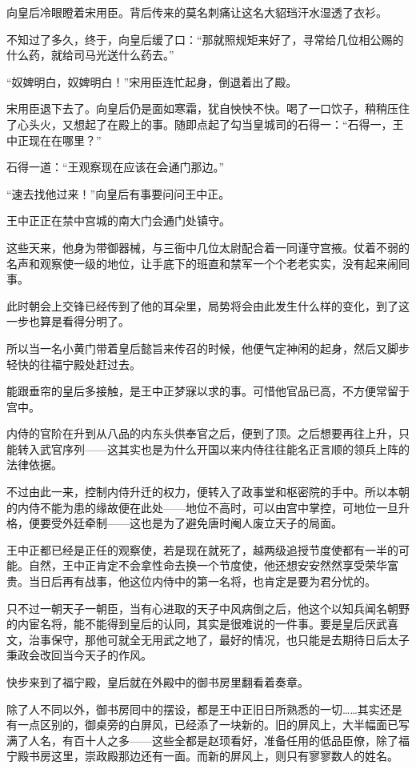 向皇后冷眼瞪着宋用臣。背后传来的莫名刺痛让这名大貂珰汗水湿透了衣衫。

不知过了多久，终于，向皇后缓了口：“那就照规矩来好了，寻常给几位相公赐的什么药，就给司马光送什么药去。”

“奴婢明白，奴婢明白！”宋用臣连忙起身，倒退着出了殿。

宋用臣退下去了。向皇后仍是面如寒霜，犹自怏怏不快。喝了一口饮子，稍稍压住了心头火，又想起了在殿上的事。随即点起了勾当皇城司的石得一：“石得一，王中正现在在哪里？”

石得一道：“王观察现在应该在会通门那边。”

“速去找他过来！”向皇后有事要问问王中正。

王中正正在禁中宫城的南大门会通门处镇守。

这些天来，他身为带御器械，与三衙中几位太尉配合着一同谨守宫掖。仗着不弱的名声和观察使一级的地位，让手底下的班直和禁军一个个老老实实，没有起来闹囘事。

此时朝会上交锋已经传到了他的耳朵里，局势将会由此发生什么样的变化，到了这一步也算是看得分明了。

所以当一名小黄门带着皇后懿旨来传召的时候，他便气定神闲的起身，然后又脚步轻快的往福宁殿处赶过去。


能跟垂帘的皇后多接触，是王中正梦寐以求的事。可惜他官品已高，不方便常留于宫中。

内侍的官阶在升到从八品的内东头供奉官之后，便到了顶。之后想要再往上升，只能转入武官序列——这其实也是为什么开国以来内侍往往能名正言顺的领兵上阵的法律依据。

不过由此一来，控制内侍升迁的权力，便转入了政事堂和枢密院的手中。所以本朝的内侍不能为患的缘故便在此处——地位不高时，可以由宫中掌控，可地位一旦升格，便要受外廷牵制——这也是为了避免唐时阉人废立天子的局面。

王中正都已经是正任的观察使，若是现在就死了，越两级追授节度使都有一半的可能。自然，王中正肯定不会拿性命去换一个节度使，他还想安安然然享受荣华富贵。当日后再有战事，他这位内侍中的第一名将，也肯定是要为君分忧的。

只不过一朝天子一朝臣，当有心进取的天子中风病倒之后，他这个以知兵闻名朝野的内宦名将，能不能得到皇后的认同，其实是很难说的一件事。要是皇后厌武喜文，治事保守，那他可就全无用武之地了，最好的情况，也只能是去期待日后太子秉政会改回当今天子的作风。

快步来到了福宁殿，皇后就在外殿中的御书房里翻看着奏章。

除了人不同以外，御书房囘中的摆设，都是王中正旧日所熟悉的一切……其实还是有一点区别的，御桌旁的白屏风，已经添了一块新的。旧的屏风上，大半幅面已写满了人名，有百十人之多——这些全都是赵顼看好，准备任用的低品臣僚，除了福宁殿书房这里，崇政殿那边还有一面。而新的屏风上，则只有寥寥数人的姓名。

